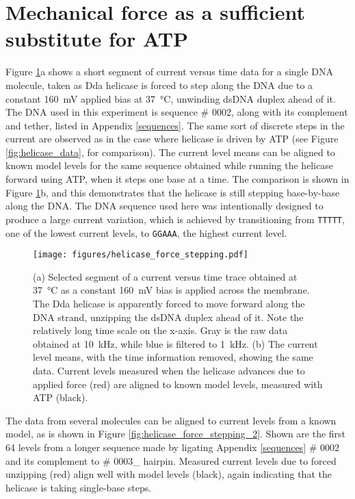 \section{Mechanical force as a sufficient substitute for ATP}

Figure \ref{fig:helicase_force_stepping}a shows a short segment of current versus time data for a single DNA molecule, taken as Dda helicase is forced to step along the DNA due to a constant \SI{160}{\mV} applied bias at \SI{37}{\celsius}, unwinding dsDNA duplex ahead of it.  The DNA used in this experiment is sequence \# 0002, along with its complement and tether, listed in Appendix \ref{sequences}.  The same sort of discrete steps in the current are observed as in the case where helicase is driven by ATP (see Figure \ref{fig:helicase_data}, for comparison).  The current level means can be aligned to known model levels for the same sequence obtained while running the helicase forward using ATP, when it steps one base at a time.  The comparison is shown in Figure \ref{fig:helicase_force_stepping}b, and this demonstrates that the helicase is still stepping base-by-base along the DNA.  The DNA sequence used here was intentionally designed to produce a large current variation, which is achieved by transitioning from \texttt{TTTTT}, one of the lowest current levels, to \texttt{GGAAA}, the highest current level.

\begin{figure}[H]
\begin{centering}
\texttt{[image: figures/helicase\_force\_stepping.pdf]}
\caption[Mechanical force substitutes for ATP and moves helicase]{(a) Selected segment of a current versus time trace obtained at \SI{37}{\celsius} as a constant \SI{160}{\mV} bias is applied across the membrane.  The Dda helicase is apparently forced to move forward along the DNA strand, unzipping the dsDNA duplex ahead of it.  Note the relatively long time scale on the x-axis.  Gray is the raw data obtained at \SI{10}{\kHz}, while blue is filtered to \SI{1}{\kHz}.  (b) The current level means, with the time information removed, showing the same data.  Current levels measured when the helicase advances due to applied force (red) are aligned to known model levels, measured with ATP (black).}
\label{fig:helicase_force_stepping}
\end{centering}
\end{figure}

The data from several molecules can be aligned to current levels from a known model, as is shown in Figure \ref{fig:helicase_force_stepping_2}.  Shown are the first \num{64} levels from a longer sequence made by ligating Appendix \ref{sequences} \# 0002 and its complement to \# 0003\_ hairpin.  Measured current levels due to forced unzipping (red) align well with model levels (black), again indicating that the helicase is taking single-base steps.

